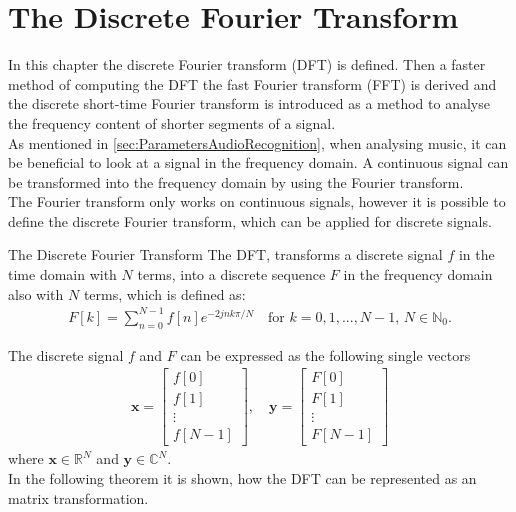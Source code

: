 \chapter{The Discrete Fourier Transform} \label{ch:DFT}
In this chapter the discrete Fourier transform (DFT) is defined. Then a faster method of computing the DFT the fast Fourier transform (FFT) is derived and the discrete short-time Fourier transform is introduced as a method to analyse the frequency content of shorter segments of a signal.\\ 
As mentioned in \autoref{sec:ParametersAudioRecognition}, when analysing music, it can be beneficial to look at a signal in the frequency domain. A continuous signal can be transformed into the frequency domain by using the Fourier transform. 
\\
The Fourier transform only works on continuous signals, however it is possible to define the discrete Fourier transform, which can be applied for discrete signals. 

\begin{definition}{The Discrete Fourier Transform}
    The DFT, transforms a discrete signal $f$ in the time domain with $N$ terms, into a discrete sequence $F$ in the frequency domain also with $N$ terms, which is defined as: 
    \begin{align*}
        F[k]=\sum^{N-1}_{n=0}f[n]e^{-2jnk\pi/N}\quad \text{for } k=0, 1, ..., N-1,\, N \in \mathbb{N}_0.
    \end{align*}
    \cite[5]{rao2011fast}
    \label{def:DFT_definiton}
\end{definition}
The discrete signal $f$ and $F$ can be expressed as the following single vectors 
\begin{align*}
    \textbf{x}=
    \begin{bmatrix}
    f[0]\\f[1]\\ \vdots \\ f[N-1]
    \end{bmatrix},
    \quad \textbf{y}=
    \begin{bmatrix}
    F[0]\\F[1]\\ \vdots \\ F[N-1]
    \end{bmatrix}
\end{align*}
where $\textbf{x} \in \mathds{R}^{N}$ and $\textbf{y} \in \mathds{C}^{N}$. 
\\
In the following theorem it is shown, how the DFT can be represented as an matrix transformation.

